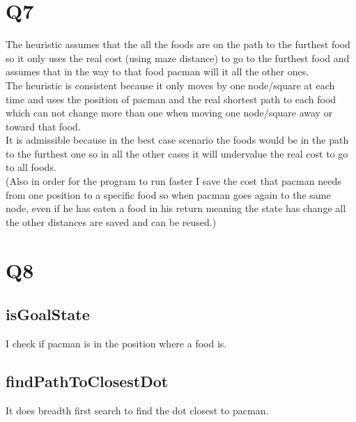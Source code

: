 \documentclass{article}
\begin{document}
\section{Q7}

The heuristic assumes that the all the foods are on the path to the furthest food so it only uses the real cost (using maze distance) to go to the furthest food and assumes that in the way to that food pacman will it all the other ones.\\
The heuristic is consistent because it only moves by one node/square at each time and uses the position of pacman and the real shortest path to each food which can not change more than one when moving one node/square away or toward that food.\\
It is admissible because in the best case scenario the foods would be in the path to the furthest one so in all the other cases it will undervalue the real cost to go to all foods.\\
(Also in order for the program to run faster I save the cost that pacman needs from one position to a specific food so when pacman goes again to the same node, even if he has eaten a food in his return meaning the state has change all the other distances are saved and can be reused.)

\section{Q8}

\subsection{isGoalState}

I check if pacman is in the position where a food is.

\subsection{findPathToClosestDot}

It does breadth first search to find the dot closest to pacman.
\end{document}
